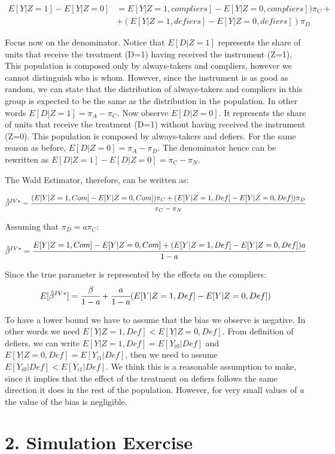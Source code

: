 \documentclass[a4paper,12pt,oneside,English]{article}
\begin{document}
\[
\begin{split}
E[Y|Z=1]-E[Y|Z=0]&=E[Y|Z=1,compliers]-E[Y|Z=0,compliers])\pi_C+\\&+(E[Y|Z=1,defiers]-E[Y|Z=0,defiers])\pi_D
\end{split}
\]

Focus now on the denominator. Notice that $E[D|Z=1]$ represents the share of units that receive the treatment (D=1) having received the instrument (Z=1). This population is composed only by always-takers and compliers, however we cannot distinguish who is whom. However, since the instrument is as good as random, we can state that the distribution of always-takers and compliers in this group is expected to be the same as the distribution in the population. In other words $E[D|Z=1]=\pi_A-\pi_C$. Now observe $E[D|Z=0]$. It represents the share of units that receive the treatment (D=1) without having received the instrument (Z=0). This population is composed by always-takers and defiers. For the same reason as before, $E[D|Z=0]=\pi_A-\pi_D$. The denominator hence can be rewritten as $E[D|Z=1]-E[D|Z=0]=\pi_C-\pi_N$.

The Wald Estimator, therefore, can be written as:

\[
\hat\beta^{IV*}=\cfrac{(E[Y|Z=1,Com]-E[Y|Z=0,Com])\pi_C+(E[Y|Z=1,Def]-E[Y|Z=0,Def])\pi_D}{\pi_C-\pi_N}
\]

Assuming that $\pi_D=a\pi_C$:

\[
\hat\beta^{IV*}=\cfrac{E[Y|Z=1,Com]-E[Y|Z=0,Com]+(E[Y|Z=1,Def]-E[Y|Z=0,Def])a}{1-a}
\]

Since the true parameter is represented by the effects on the compliers:
\[
E[\hat\beta^{IV*}]=\cfrac{\beta}{1-a}+\cfrac{a}{1-a}(E[Y|Z=1,Def]-E[Y|Z=0,Def])
\]

To have a lower bound we have to assume that the bias we observe is negative. In other words we need $E[Y|Z=1,Def]<E[Y|Z=0,Def]$. From definition of defiers, we can write $E[Y|Z=1, Def]=E[Y_{i0}|Def]$ and $E[Y|Z=0, Def]=E[Y_{i1}|Def]$, then we need to assume $E[Y_{i0}|Def]<E[Y_{i1}|Def]$. We think this is a reasonable assumption to make, since it implies that the effect of the treatment on defiers follows the same direction it does in the rest of the population. However, for very small values of \textit{a} the value of the bias is negligible.



\newpage


\section{2. Simulation Exercise}
\end{document}
